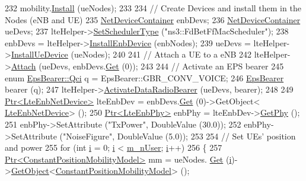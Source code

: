 \begin{DoxyCode}
232   mobility.\hyperlink{classns3_1_1MobilityHelper_a07737960ee95c0777109cf2994dd97ae}{Install} (ueNodes);
233 
234   \textcolor{comment}{// Create Devices and install them in the Nodes (eNB and UE)}
235   \hyperlink{classns3_1_1NetDeviceContainer}{NetDeviceContainer} enbDevs;
236   \hyperlink{classns3_1_1NetDeviceContainer}{NetDeviceContainer} ueDevs;
237   lteHelper->\hyperlink{classns3_1_1LteHelper_a8f86e55b8b80a81732c4b2df00fb25d5}{SetSchedulerType} (\textcolor{stringliteral}{"ns3::FdBetFfMacScheduler"});
238   enbDevs = lteHelper->\hyperlink{classns3_1_1LteHelper_a5e009ad35ef85f46b5a6099263f15a03}{InstallEnbDevice} (enbNodes);
239   ueDevs = lteHelper->\hyperlink{classns3_1_1LteHelper_ac9cd932d7de92811cfa953c2e3b2fc9f}{InstallUeDevice} (ueNodes);
240 
241   \textcolor{comment}{// Attach a UE to a eNB}
242   lteHelper->\hyperlink{classns3_1_1LteHelper_a9466743f826aa2652a87907b7f0a1c87}{Attach} (ueDevs, enbDevs.\hyperlink{classns3_1_1NetDeviceContainer_a677d62594b5c9d2dea155cc5045f4d0b}{Get} (0));
243 
244   \textcolor{comment}{// Activate an EPS bearer}
245   \textcolor{keyword}{enum} \hyperlink{structns3_1_1EpsBearer_aecf0c67109c5eb4ec0b07226fff5885e}{EpsBearer::Qci} q = EpsBearer::GBR\_CONV\_VOICE;
246   \hyperlink{structns3_1_1EpsBearer}{EpsBearer} bearer (q);
247   lteHelper->\hyperlink{classns3_1_1LteHelper_ac896e16cf162e4beeaa292d39ab1b700}{ActivateDataRadioBearer} (ueDevs, bearer);
248 
249   \hyperlink{classns3_1_1Ptr}{Ptr<LteEnbNetDevice>} lteEnbDev = enbDevs.\hyperlink{classns3_1_1NetDeviceContainer_a677d62594b5c9d2dea155cc5045f4d0b}{Get} (0)->GetObject<
      \hyperlink{classns3_1_1LteEnbNetDevice}{LteEnbNetDevice}> ();
250   \hyperlink{classns3_1_1Ptr}{Ptr<LteEnbPhy>} enbPhy = lteEnbDev->\hyperlink{classns3_1_1LteEnbNetDevice_a58db72130e0740f16a5e03b22e4a10a4}{GetPhy} ();
251   enbPhy->SetAttribute (\textcolor{stringliteral}{"TxPower"}, DoubleValue (30.0));
252   enbPhy->SetAttribute (\textcolor{stringliteral}{"NoiseFigure"}, DoubleValue (5.0));
253 
254   \textcolor{comment}{// Set UEs' position and power}
255   \textcolor{keywordflow}{for} (\textcolor{keywordtype}{int} \hyperlink{bernuolliDistribution_8m_a6f6ccfcf58b31cb6412107d9d5281426}{i} = 0; \hyperlink{bernuolliDistribution_8m_a6f6ccfcf58b31cb6412107d9d5281426}{i} < \hyperlink{classLenaFdBetFfMacSchedulerTestCase1_a9c055f74557f2149bf01272cea885323}{m\_nUser}; \hyperlink{bernuolliDistribution_8m_a6f6ccfcf58b31cb6412107d9d5281426}{i}++)
256     \{
257       \hyperlink{classns3_1_1Ptr}{Ptr<ConstantPositionMobilityModel>} mm = ueNodes.
      \hyperlink{classns3_1_1NodeContainer_a9ed96e2ecc22e0f5a3d4842eb9bf90bf}{Get} (\hyperlink{bernuolliDistribution_8m_a6f6ccfcf58b31cb6412107d9d5281426}{i})->\hyperlink{classns3_1_1Object_a13e18c00017096c8381eb651d5bd0783}{GetObject}<\hyperlink{classns3_1_1ConstantPositionMobilityModel}{ConstantPositionMobilityModel}> ();

\end{DoxyCode}
